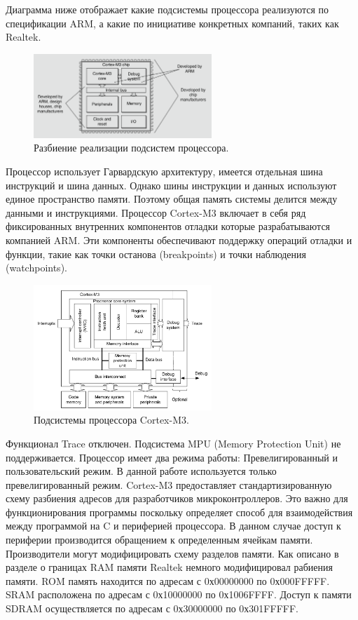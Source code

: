 Диаграмма ниже отображает какие подсистемы процессора реализуются по спецификации ARM, а какие по инициативе конкретных компаний, таких как Realtek.

\begin{figure}[h!]
    \centering
    \includegraphics[width=0.6\textwidth]{arm_vs_custom_modules.png}
    \caption{Разбиение реализации подсистем процессора.}
\end{figure}


Процессор использует Гарвардскую архитектуру, имеется отдельная шина инструкций и шина данных. Однако шины инструкции и данных используют единое пространство памяти. Поэтому общая память системы делится между данными и инструкциями. Процессор Cortex-M3 включает в себя ряд фиксированных внутренних компонентов отладки которые разрабатываются компанией ARM. Эти компоненты обеспечивают поддержку операций отладки и функции, такие как точки останова (breakpoints) и точки наблюдения (watchpoints).

\begin{figure}[h!]
    \centering
    \includegraphics[width=0.6\textwidth]{cortex_m3_subsystems_overview.png}
    \caption{Подсистемы процессора Cortex-M3.}
\end{figure}


Функционал Trace отключен. Подсистема MPU (Memory Protection Unit) не поддерживается.
Процессор имеет два режима работы: Превелигированный и пользовательский режим. В данной работе используется только превелигированный режим. Cortex-M3 предоставляет стандартизированную схему разбиения адресов для разработчиков микроконтроллеров. Это важно для функционирования программы поскольку определяет способ для взаимодействия между программой на C и периферией процессора. В данном случае доступ к периферии производится обращением к определенным ячейкам памяти. Производители могут модифицировать схему разделов памяти. Как описано в разделе о границах RAM памяти Realtek немного модифицировал рабиения памяти. ROM память находится по адресам с 0х00000000 по 0х000FFFFF. SRAM расположена по адресам с 0х10000000 по 0х1006FFFF. Доступ к памяти SDRAM осуществляется по адресам с 0х30000000 по 0х301FFFFF.
 
